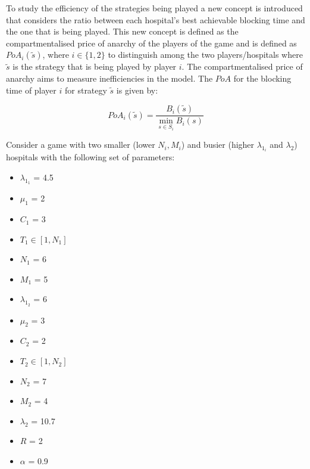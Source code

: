 To study the efficiency of the strategies being played a new concept is 
introduced that considers the ratio between each hospital's best achievable 
blocking time and the one that is being played.
This new concept is defined as the compartmentalised price of anarchy of the 
players of the game and is defined as \(PoA_i(\tilde{s})\), where 
\(i \in \{1, 2\}\) to distinguish among the two players/hospitals where 
\(\tilde{s}\) is the strategy that is being played by player \( i \). 
The compartmentalised price of anarchy aims to measure inefficiencies in the 
model.
The \(PoA\) for the blocking time of player \(i\) for strategy \(\tilde{s}\) 
is given by:

\begin{equation}\label{eq:poa_compartmentalised}
    PoA_{i}(\tilde{s}) = \frac{B_i(\tilde{s})}{\min_{s \in S_i} B_i(s)}
\end{equation}

Consider a game with two smaller (lower \( N_i, M_i \)) and busier (higher 
\(\lambda_{1_i} \) and \(\lambda_2\)) hospitals with the following set of 
parameters:

\begin{multicols}{3}
    \begin{itemize}        
        \item \( \lambda_{1_1} \) = 4.5
        \item \( \mu_1 \) = 2
        \item \( C_1 \) = 3
        \item \( T_1 \in [1, N_1] \) 
        \item \( N_1 \) = 6
        \item \( M_1 \) = 5

        \columnbreak
        \item \( \lambda_{1_2} \) = 6
        \item \( \mu_2 \) = 3
        \item \( C_2 \) = 2
        \item \( T_2 \in [1, N_2] \)
        \item \( N_2 \) = 7
        \item \( M_2 \) = 4
        
        \columnbreak
        \item \( \lambda_2 \) = 10.7
        \item \( R \) = 2
        \item \( \alpha \) = 0.9
    \end{itemize}
\end{multicols}

